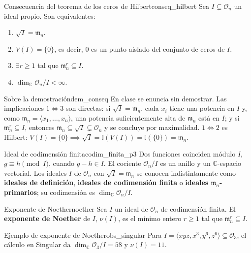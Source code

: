\documentclass[11pt,a4paper]{article}
\begin{document}
\begin{teorema}{Consecuencia del teorema de los ceros de Hilbert}{conseq_hilbert}
Sea $I \subsetneq \mathcal{O}_n$ un ideal propio. Son equivalentes:
\begin{enumerate}
    \item[1)] $\sqrt{I} = \mathfrak{m}_n$.
    \item[2)] $V(I) = \{0\}$, es decir, $0$ es un punto aislado del conjunto de ceros de $I$.
    \item[3)] $\exists r \ge 1$ tal que $\mathfrak{m}_n^r \subseteq I$.
    \item[4)] $\dim_{\mathbb{C}} \mathcal{O}_n / I < \infty$.
\end{enumerate}
\end{teorema}

\begin{nota}{Sobre la demostración}{dem_conseq}
En clase se enuncia sin demostrar. Las implicaciones $1 \iff 3$ son directas: si $\sqrt{I} = \mathfrak{m}_n$, cada $x_i$ tiene una potencia en $I$ y, como $\mathfrak{m}_n = \langle x_1, \dots, x_n \rangle$, una potencia suficientemente alta de $\mathfrak{m}_n$ está en $I$; y si $\mathfrak{m}_n^r \subseteq I$, entonces $\mathfrak{m}_n \subseteq \sqrt{I} \subsetneq \mathcal{O}_n$ y se concluye por maximalidad. $1 \iff 2$ es Hilbert: $V(I) = \{0\} \implies \sqrt{I} = \mathbb{I}(V(I)) = \mathbb{I}(\{0\}) = \mathfrak{m}_n$.
\end{nota}

\begin{definicion}{Ideal de codimensión finita}{codim_finita_p3}
Dos funciones coinciden módulo $I$, $g \equiv h \pmod I$, cuando $g - h \in I$. El cociente $\mathcal{O}_n / I$ es un anillo y un $\mathbb{C}$-espacio vectorial. Los ideales $I$ de $\mathcal{O}_n$ con $\sqrt{I} = \mathfrak{m}_n$ se conocen indistintamente como \textbf{ideales de definición}, \textbf{ideales de codimensión finita} o \textbf{ideales $\mathfrak{m}_n$-primarios}; su codimensión es $\dim_{\mathbb{C}} \mathcal{O}_n/I$.
\end{definicion}

\begin{definicion}{Exponente de Noether}{noether}
Sea $I$ un ideal de $\mathcal{O}_n$ de codimensión finita. El \textbf{exponente de Noether} de $I$, $\nu(I)$, es el mínimo entero $r \ge 1$ tal que $\mathfrak{m}_n^r \subseteq I$.
\end{definicion}

\begin{observacion}{Ejemplo de exponente de Noether}{obs_singular}
Para $I = \langle xyz, x^3, y^6, z^6 \rangle \subseteq \mathcal{O}_3$, el cálculo en Singular da $\dim_{\mathbb{C}} \mathcal{O}_3/I = 58$ y $\nu(I) = 11$.
\end{observacion}
\end{document}
